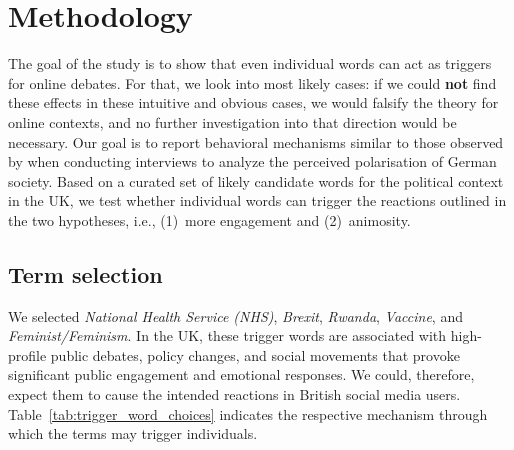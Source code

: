 \section{Methodology}
The goal of the study is to show that even individual words can act as triggers for online debates. For that, we look into most likely cases: if we could \textbf{not} find these effects in these intuitive and obvious cases, we would falsify the theory for online contexts, and no further investigation into that direction would be necessary. Our goal is to report behavioral mechanisms similar to those observed by \citet{mau2023triggerpunkte} when conducting interviews to analyze the perceived polarisation of German society. Based on a curated set of likely candidate words for the political context in the UK, we test whether individual words can trigger the reactions outlined in the two hypotheses, i.e., (1)\ more engagement and (2)\ animosity.


\subsection{Term selection}
We selected \textit{National Health Service (NHS)}, \textit{Brexit}, \textit{Rwanda}, \textit{Vaccine}, and \textit{Feminist/Feminism}. In the UK, these trigger words are associated with high-profile public debates, policy changes, and social movements that provoke significant public engagement and emotional responses. We could, therefore, expect them to cause the intended reactions in British social media users. Table~\ref{tab:trigger_word_choices} indicates the respective mechanism through which the terms may trigger individuals. 

\begin{table}[]
\caption{Trigger words and their respective trigger mechanisms (described in the introduction).}
\label{tab:trigger_word_choices}
\end{table}

